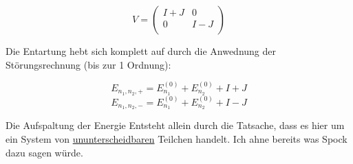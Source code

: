 \[V =  \begin{pmatrix} I+J & 0 \\
 0 & I-J \\
\end{pmatrix} \]

Die Entartung hebt sich komplett auf durch die Anwednung der Störungsrechnung (bis zur 1 Ordnung):


\[E_{n_1,n_2,+} = E_{n_1}^{(0)}+E_{n_2}^{(0)}+I+J\]
\[E_{n_1,n_2,-} = E_{n_1}^{(0)}+E_{n_2}^{(0)}+I-J\]


Die Aufspaltung der Energie Entsteht allein durch die Tatsache, dass es hier um ein System von \underline{ununterscheidbaren} Teilchen handelt. Ich ahne bereits was Spock dazu sagen würde.





 